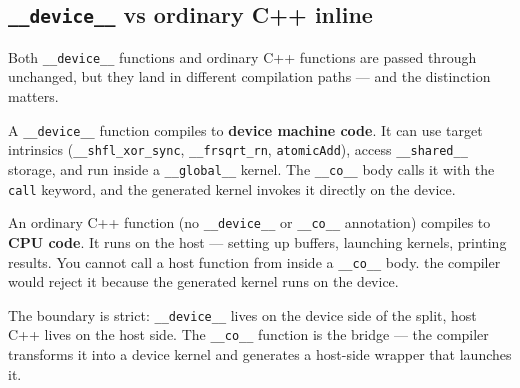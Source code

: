 \subsection*{\texttt{\_\_device\_\_} vs ordinary C++ inline}

Both \texttt{\_\_device\_\_} functions and ordinary C++ functions are passed through unchanged, but they land in different compilation paths --- and the distinction matters.

A \texttt{\_\_device\_\_} function compiles to \textbf{device machine code}. It can use target intrinsics (\texttt{\_\allowbreak{}\_\allowbreak{}shfl\_\allowbreak{}xor\_\allowbreak{}sync}, \texttt{\_\_frsqrt\_rn}, \texttt{atomicAdd}), access \texttt{\_\_shared\_\_} storage, and run inside a \texttt{\_\_global\_\_} kernel. The \texttt{\_\_co\_\_} body calls it with the \texttt{call} keyword, and the generated kernel invokes it directly on the device.

An ordinary C++ function (no \texttt{\_\_device\_\_} or \texttt{\_\_co\_\_} annotation) compiles to \textbf{CPU code}. It runs on the host --- setting up buffers, launching kernels, printing results. You cannot call a host function from inside a \texttt{\_\_co\_\_} body. the compiler would reject it because the generated kernel runs on the device.

The boundary is strict: \texttt{\_\_device\_\_} lives on the device side of the split, host C++ lives on the host side. The \texttt{\_\_co\_\_} function is the bridge --- the compiler transforms it into a device kernel and generates a host-side wrapper that launches it.
